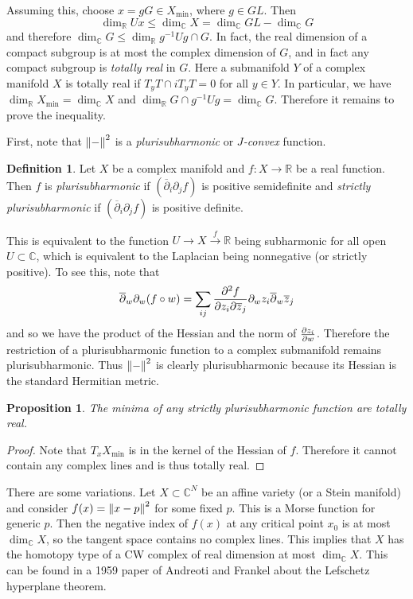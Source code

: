 \documentclass[leqno, openany]{memoir}
\newtheorem{prop}[thm]{Proposition}
\theoremstyle{definition}
\newtheorem{defn}[thm]{Definition}
\theoremstyle{remark}
\theoremstyle{plain}
\theoremstyle{definition}
\theoremstyle{remark}
\newcommand{\R}{\mathbb{R}}
\newcommand{\C}{\mathbb{C}}
\newcommand{\ol}[1]{\overline{#1}}
\begin{document}
Assuming this, choose $x = gG \in X_{\min}$, where $g \in GL$. Then 
\[ \dim_{\R} U x \leq \dim_{\C} X = \dim_{\C} GL - \dim_{\C} G \]
and therefore $\dim_{\C} G \leq \dim_{\R} g^{-1} U g \cap G$. In fact, the real dimension of a compact subgroup is at most the complex dimension of $G$, and in fact any compact subgroup is \textit{totally real} in $G$. Here a submanifold $Y$ of a complex manifold $X$ is totally real if $T_y T \cap i T_y T = 0$ for all $y \in Y$. In particular, we have $\dim_{\R} X_{\min} = \dim_{\C} X$ and $\dim_{\R} G \cap g^{-1} U g = \dim_{\C} G$. Therefore it remains to prove the inequality.

First, note that $\norm{-}^2$ is a \textit{plurisubharmonic} or \textit{$J$-convex} function.

\begin{defn}
    Let $X$ be a complex manifold and $f \colon X \to \R$ be a real function. Then $f$ is \textit{plurisubharmonic} if $( \ol{\partial}_i \partial_j f )$ is positive semidefinite and \textit{strictly plurisubharmonic} if $(\ol{\partial}_i \partial_j f)$ is positive definite. 
\end{defn}

This is equivalent to the function $U \to X \xrightarrow{f} \R$ being subharmonic for all open $U \subset \C$, which is equivalent to the Laplacian being nonnegative (or strictly positive). To see this, note that
\[ \ol{\partial}_w \partial_w (f \circ w) = \sum_{ij} \pdv[2]{f}{z_i}{\ol{z}_j} \partial_w z_i \ol{\partial}_w \ol{z}_j \]
and so we have the product of the Hessian and the norm of $\pdv{z_i}{w}$. Therefore the restriction of a plurisubharmonic function to a complex submanifold remains plurisubharmonic. Thus $\norm{-}^2$ is clearly plurisubharmonic because its Hessian is the standard Hermitian metric.

\begin{prop}
    The minima of any strictly plurisubharmonic function are totally real.
\end{prop}

\begin{proof}
    Note that $T_x X_{\min}$ is in the kernel of the Hessian of $f$. Therefore it cannot contain any complex lines and is thus totally real.
\end{proof}

There are some variations. Let $X \subset \C^N$ be an affine variety (or a Stein manifold) and consider $f(x) = \norm{x-p}^2$ for some fixed $p$. This is a Morse function for generic $p$. Then the negative index of $f(x)$ at any critical point $x_0$ is at most $\dim_{\C} X$, so the tangent space contains no complex lines. This implies that $X$ has the homotopy type of a CW complex of real dimension at most $\dim_{\C} X$. This can be found in a 1959 paper of Andreoti and Frankel about the Lefschetz hyperplane theorem.
\end{document}

